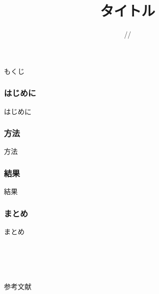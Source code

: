\documentclass[aspectratio=169, lualatex]{beamer}
\title{タイトル}
\author{\myname}
\date{\the\year/\the\month/\the\day}
\institute[\myorgshort]{\myorg}
\begin{document}
\begingroup

    \maketitle
\endgroup


\begin{frame}[plain]{もくじ}
    \tableofcontents[hideallsubsections]
\end{frame}

\section{はじめに}
\begin{frame}{はじめに}

\end{frame}

\section{方法}
\begin{frame}{方法}

\end{frame}

\section{結果}
\begin{frame}{結果}

\end{frame}

\section{まとめ}
\begin{frame}{まとめ}

\end{frame}

\part*{}
\begingroup
    \begin{frame}
        \begin{center}
            {\bf \myname}\\
            {\scriptsize \mymail}\\
        \end{center}
    \end{frame}

    \begin{frame}[plain]{参考文献}
        \nocite{*}
        \printbibliography
    \end{frame}
\endgroup
\end{document}
